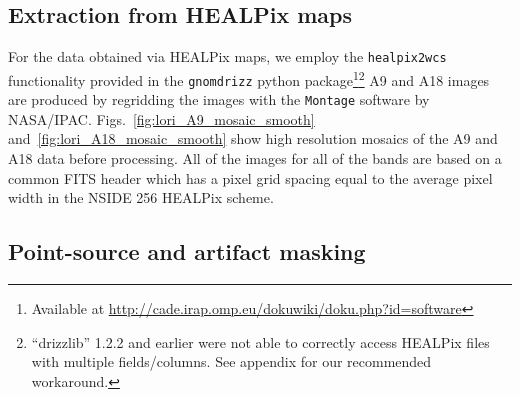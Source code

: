 		\subsection{Extraction from HEALPix maps}
		  For the data obtained via HEALPix maps, we employ the {\tt healpix2wcs} functionality provided in the {\tt gnomdrizz} python package\footnote{Available at \url{http://cade.irap.omp.eu/dokuwiki/doku.php?id=software}}\footnote{``drizzlib'' 1.2.2 and earlier were not able to correctly access HEALPix files with multiple fields/columns. See appendix for our recommended workaround.} A9 and A18 images are produced by regridding the images with the {\tt Montage} software by NASA/IPAC. Figs.~\ref{fig:lori_A9_mosaic_smooth} and~\ref{fig:lori_A18_mosaic_smooth} show high resolution mosaics of the A9 and A18 data before processing. All of the images for all of the bands are based on a common FITS header which has a pixel grid spacing equal to the average pixel width in the NSIDE 256 HEALPix scheme.

      \subsection{Point-source and artifact masking}

